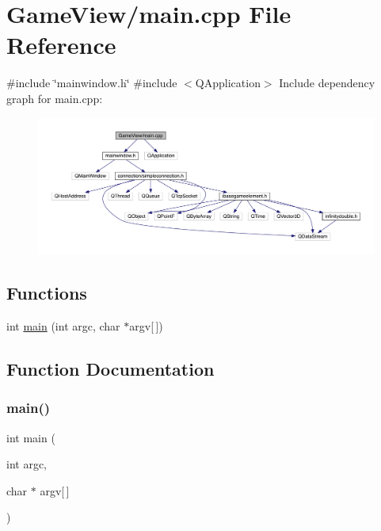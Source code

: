 \hypertarget{a00238}{}\section{Game\+View/main.cpp File Reference}
\label{a00238}
{\ttfamily \#include \char`\"{}mainwindow.\+h\char`\"{}}\newline
{\ttfamily \#include $<$Q\+Application$>$}\newline
Include dependency graph for main.\+cpp\+:
\nopagebreak
\begin{figure}[H]
\begin{center}
\leavevmode
\includegraphics[width=350pt]{d0/d27/a00239}
\end{center}
\end{figure}
\subsection*{Functions}
\begin{DoxyCompactItemize}
\item 
int \hyperlink{a00238_a0ddf1224851353fc92bfbff6f499fa97}{main} (int argc, char $\ast$argv\mbox{[}$\,$\mbox{]})
\end{DoxyCompactItemize}


\subsection{Function Documentation}
\mbox{\label{a00238_a0ddf1224851353fc92bfbff6f499fa97}} 
\subsubsection{\texorpdfstring{main()}{main()}}
{\footnotesize\ttfamily int main (\begin{DoxyParamCaption}\item[{int}]{argc,  }\item[{char $\ast$}]{argv\mbox{[}$\,$\mbox{]} }\end{DoxyParamCaption})}



